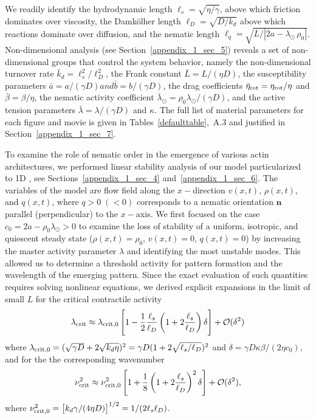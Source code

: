 We readily identify the hydrodynamic length $\ell_s =\sqrt{\eta/\gamma}$, above which friction dominates over viscosity, the Damk\"olher length $\ell_D =\sqrt{D/k_d}$ above which reactions dominate over diffusion, and the nematic length $\ell_q=\sqrt{L/ \left | 2a - \lambda_{\odot} \, \rho_0 \right |}$. Non-dimensional analysis (see Section~\ref{appendix_1_sec_5}) reveals a set of non-dimensional groups that control the system behavior, namely the non-dimensional turnover rate $\bar{k}_d = \ell_s^2/\ell_D^2$, the  Frank constant $\bar{L} = L/(\eta D)$, the susceptibility parameters $\bar{a} = a/(\gamma D) and \bar{b} = b/(\gamma D)$, the drag coefficients $\bar{\eta}_{\rm rot} = {\eta}_{\rm rot}/\eta$ and $\bar{\beta} = \beta /\eta$, the nematic activity coefficient $\bar{\lambda}_\odot=\rho_0 \lambda_\odot / (\gamma D)$, and the active tension parameters $\bar{\lambda} = \lambda / (\gamma D)$ and $\kappa$.  The full list of material parameters for each figure and movie is given in Tables~\ref{defaulttable},~A.3 and justified in Section~\ref{appendix_1_sec_7}.


\medskip
{} To examine the role of nematic order in the emergence of various actin architectures, we performed linear stability analysis of our model particularized to 1D , see Sections~\ref{appendix_1_sec_4} and~\ref{appendix_1_sec_6}. The variables of the model are flow field along the $x-$direction $v(x,t)$, $\rho(x,t)$, and $q(x,t)$, where  $q>0\;(<0)$ corresponds to a nematic  orientation $\bm{n}$ parallel (perpendicular) to the $x-$axis. We first focused on the case $c_0=2a - \rho_0 \lambda_{\odot}>0$ to examine the loss of stability of a uniform, isotropic, and quiescent steady state ($\rho(x,t) = \rho_0$, $v(x,t) = 0$, $q(x,t)=0$) by increasing the master activity parameter $\lambda$ and identifying the most unstable modes. This allowed us to determine a threshold activity for pattern formation and the wavelength of the emerging pattern. Since the exact evaluation of such quantities requires solving nonlinear equations, we derived explicit expansions in the limit of small $L$ for the critical contractile activity 
\begin{align}
	\lambda_{\rm crit} \approx \lambda_{\rm crit,0} \left[1 - \frac{1}{2}\frac{\ell_s}{\ell_D}\left(1+  2\frac{\ell_s}{\ell_D}\right) \delta \right] + \mathcal{O}(\delta^2)
	\label{lam_c}
\end{align}
where $\lambda_{\rm crit,0} = (\sqrt{\gamma D} + 2 \sqrt{k_d\eta})^2 = \gamma D (1+2\sqrt{\ell_s/\ell_D})^2$ and $\delta = \gamma D \kappa \beta /(2\eta c_0)$, 
and for the the corresponding wavenumber
\begin{align}
	\nu_{\rm crit}^2 \approx \nu_{\rm crit,0}^2\left[1 + \frac{1}{8}\left(1 +  2\frac{\ell_s}{\ell_D}\right)^2 \delta \right] + \mathcal{O}(\delta^2), \label{nu_c}
\end{align}
where $\nu_{\rm crit,0}^2 = \left[k_d \gamma /(4\eta D)\right]^{1/2} = 1/({2\ell_s\ell_D})$. 

